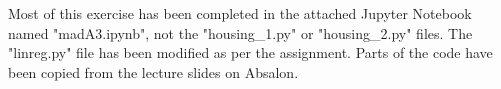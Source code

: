 Most of this exercise has been completed in the attached Jupyter Notebook named "madA3.ipynb", not the "housing\_1.py" or "housing\_2.py" files. The "linreg.py" file has been modified as per the assignment. Parts of the code have been copied from the lecture slides on Absalon.